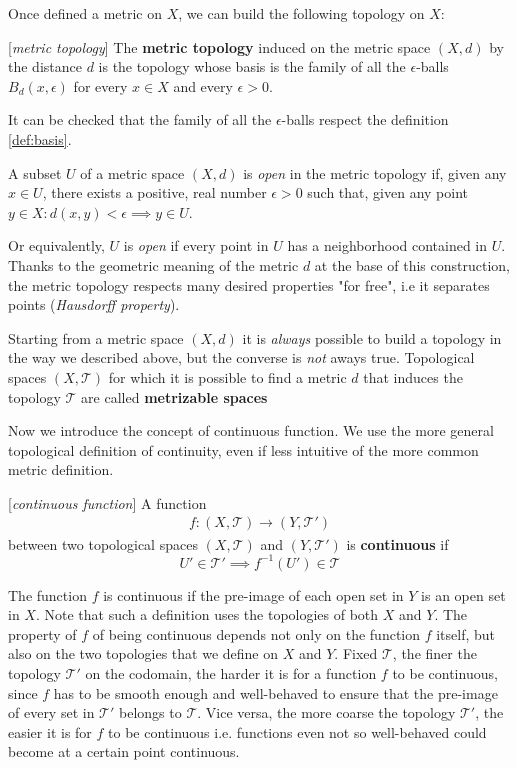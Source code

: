 Once defined a metric on $X$, we can build the following topology on $X$:
\begin{definition}{[\textit{metric topology}]}
	The \textbf{metric topology} induced on the metric space $(X,d)$ by the distance $d$ is the topology whose basis is the family of all the $\epsilon$-balls $B_d(x, \epsilon)$ for every $x \in X$ and every $\epsilon > 0$. 
\end{definition}
It can be checked that the family of all the $\epsilon$-balls respect the definition \ref{def:basis}.
\begin{prop*}
	A subset $U$ of a metric space $(X, d)$ is \textit{open} in the metric topology if, given any $x\in U$, there exists a positive, real number $\epsilon > 0$ such that, given any point $y \in X: d(x, y) < \epsilon \implies y \in U$.
\end{prop*}  Or equivalently, $U$ is \textit{open} if every point in $U$ has a neighborhood contained in $U$. \newline
Thanks to the geometric meaning of the metric $d$ at the base of this construction, the metric topology respects many desired properties "for free", i.e it separates points (\textit{Hausdorff property}).
\begin{remark}
	Starting from a metric space $(X,d)$ it is \textit{always} possible to build a topology in the way we described above, but the converse is \textit{not} aways true. Topological spaces $(X,\mathcal{T})$ for which it is possible to find a metric $d$ that induces the topology $\mathcal{T}$ are called \textbf{metrizable spaces}
\end{remark}
Now we introduce the concept of continuous function. We use the more general topological definition of continuity, even if less intuitive of the more common metric definition.
\begin{definition}{[\textit{continuous function}]}
	A function
	\begin{align*}
	f:(X,\mathcal{T}) \rightarrow (Y,\mathcal{T}')
	\end{align*}
	between two topological spaces $(X,\mathcal{T})$ and $(Y,\mathcal{T}')$ is \textbf{continuous} if $$ U'\in\mathcal{T}' \implies f^{-1}(U')\in \mathcal{T}$$
	\label{def:continuity}
\end{definition}
The function $f$ is continuous if the pre-image of each open set in $Y$ is an open set in $X$. Note that such a definition uses the topologies of both $X$ and $Y$. The property of $f$ of being continuous depends not only on the function $f$ itself, but also on the two topologies that we define on $X$ and $Y$. Fixed $\mathcal{T}$, the finer the topology $\mathcal{T}'$ on the codomain, the harder it is for a function $f$ to be continuous, since $f$ has to be smooth enough and well-behaved to ensure that the pre-image of every set in $\mathcal{T}'$  belongs to $\mathcal{T}$. Vice versa, the more coarse the topology $\mathcal{T}'$, the easier it is for $f$ to be continuous i.e. functions even not so well-behaved could become at a certain point continuous.
